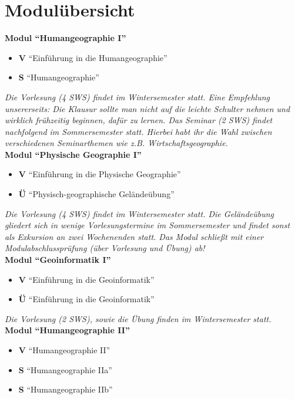 \section{Modulübersicht}
\textbf{Modul "`Humangeographie I"'}
	\begin{itemize}
		\item \textbf{V} "`Einführung in die Humangeographie"'
		\item \textbf{S} "`Humangeographie"'
	\end{itemize}
\emph{Die Vorlesung (4 SWS) findet im Wintersemester statt. Eine Empfehlung unsererseits: Die Klausur sollte man nicht auf die leichte Schulter nehmen und wirklich frühzeitig beginnen, dafür zu lernen. Das Seminar (2 SWS) findet nachfolgend im Sommersemester statt. Hierbei habt ihr die Wahl zwischen verschiedenen Seminarthemen wie z.B. Wirtschaftsgeographie.}\\

\textbf{Modul "`Physische Geographie I"'}
	\begin{itemize}
		\item \textbf{V} "`Einführung in die Physische Geographie"'
		\item \textbf{Ü} "`Physisch-geographische Geländeübung"'
	\end{itemize}
\emph{Die Vorlesung (4 SWS) findet im Wintersemester statt. Die Geländeübung gliedert sich in wenige Vorlesungstermine im Sommersemester und findet sonst als Exkursion an zwei Wochenenden statt. Das Modul schließt mit einer Modulabschlussprüfung (über Vorlesung und Übung) ab!}\\

\textbf{Modul "`Geoinformatik I"'}
	\begin{itemize}
		\item \textbf{V} "`Einführung in die Geoinformatik"'
		\item \textbf{Ü} "`Einführung in die Geoinformatik"'
	\end{itemize}
\emph{Die Vorlesung (2 SWS), sowie die Übung finden im Wintersemester statt.}\\

\textbf{Modul "`Humangeographie II"'}
	\begin{itemize}
		\item \textbf{V} "`Humangeographie II"'
		\item \textbf{S} "`Humangeographie IIa"'
		\item \textbf{S} "`Humangeographie IIb"'
	\end{itemize}

